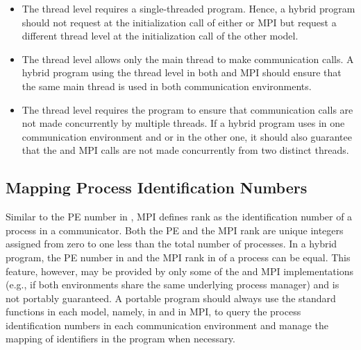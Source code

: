 \begin{itemize}
    \item The  thread level requires a single-threaded program.
    Hence, a hybrid program should not request  at the initialization
    call of either \openshmem or MPI but request a different thread level at the
    initialization call of the other model.

    \item The  thread level allows only the main thread to
    make communication calls. A hybrid program using the 
    thread level in both \openshmem and MPI should ensure that the same main thread
    is used in both communication environments.

    \item The  thread level requires the program to ensure
    that communication calls are not made concurrently by multiple threads. If a
    hybrid program uses  in one communication environment
    and  or  in the other one, it
    should also guarantee that the \openshmem and MPI calls are not made concurrently
    from two distinct threads.
\end{itemize}

\subsection{Mapping Process Identification Numbers}
\label{subsec:interoperability:id}

Similar to the \ac{PE} number in \openshmem, MPI defines rank as the
identification number of a process in a communicator. Both the \openshmem \ac{PE}
and the MPI rank are unique integers assigned from zero to one less than the total
number of processes. In a hybrid program, the \openshmem
\ac{PE} number in 
and the MPI rank in  of a process can be equal.
This feature, however, may be provided by only some of the \openshmem and MPI
implementations (e.g., if both environments share the same underlying process
manager) and is not portably guaranteed. A portable program should always
use the standard functions in each model, namely,  in \openshmem
and  in MPI, to query the process identification numbers
in each communication environment and manage the mapping of identifiers in the
program when necessary.

